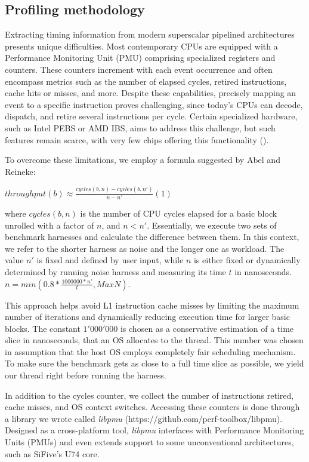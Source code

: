 \subsection{Profiling methodology}

Extracting timing information from modern superscalar pipelined architectures presents unique difficulties. Most contemporary CPUs are equipped with a Performance Monitoring Unit (PMU) comprising specialized registers and counters. These counters increment with each event occurrence and often encompass metrics such as the number of elapsed cycles, retired instructions, cache hits or misses, and more. Despite these capabilities, precisely mapping an event to a specific instruction proves challenging, since today's CPUs can decode, dispatch, and retire several instructions per cycle. Certain specialized hardware, such as Intel PEBS or AMD IBS, aims to address this challenge, but such features remain scarce, with very few chips offering this functionality ().

To overcome these limitations, we employ a formula suggested by Abel and Reineke\cite{abelUiCAAccurateThroughput2022}:

$throughput(b) \approx \frac{cycles(b, n) - cycles(b, n')}{n - n'} (1)$

where $cycles(b, n)$ is the number of CPU cycles elapsed for a basic block unrolled with a factor of $n$, and $n < n'$. Essentially, we execute two sets of benchmark harnesses and calculate the difference between them. In this context, we refer to the shorter harness as noise and the longer one as workload. The value $n'$ is fixed and defined by user input, while $n$ is either fixed or dynamically determined by running noise harness and measuring its time $t$ in nanoseconds.
$n = min(0.8*\frac{1000000 * n'}{t}, MaxN)$.

This approach helps avoid L1 instruction cache misses by limiting the maximum number of iterations and dynamically reducing execution time for larger basic blocks. The constant $1'000'000$ is chosen as a conservative estimation of a time slice in nanoseconds, that an OS allocates to the thread. This number was chosen in assumption that the host OS employs completely fair scheduling mechanism. To make sure the benchmark gets as close to a full time slice as possible, we yield our thread right before running the harness.

In addition to the cycles counter, we collect the number of instructions retired, cache misses, and OS context switches. Accessing these counters is done through a library we wrote called \textit{libpmu} (https://github.com/perf-toolbox/libpmu). Designed as a cross-platform tool, \textit{libpmu} interfaces with Performance Monitoring Units (PMUs) and even extends support to some unconventional architectures, such as SiFive's U74 core.

